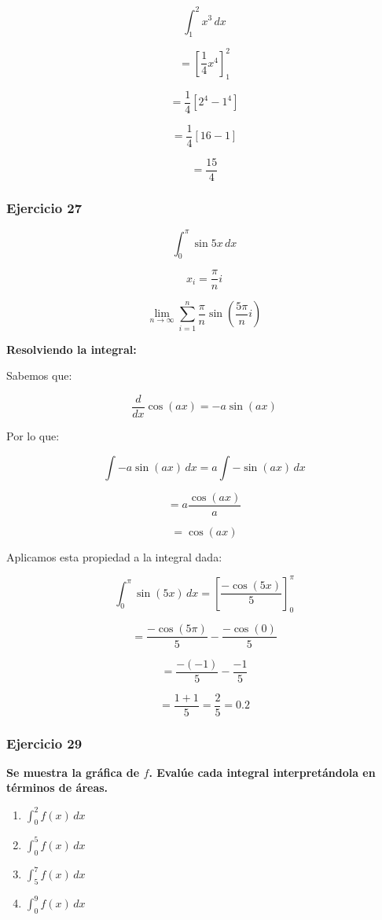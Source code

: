 \[
\int_{1}^{2} x^3 \,dx
\]

\[
= \left[ \frac{1}{4} x^4 \right]_{1}^{2}
\]

\[
= \frac{1}{4} \left[ 2^4 - 1^4 \right]
\]

\[
= \frac{1}{4} \left[ 16 - 1 \right]
\]

\[
= \frac{15}{4}
\]


\subsubsection*{Ejercicio 27}

\[
\int_{0}^{\pi} \sin 5x \,dx
\]

\[
x_i = \frac{\pi}{n} i
\]

\[
\lim_{n \to \infty} \sum_{i=1}^{n} \frac{\pi}{n} \sin \left( \frac{5\pi}{n} i \right)
\]

\textbf{Resolviendo la integral:}

Sabemos que:

\[
\frac{d}{dx} \cos(ax) = -a \sin(ax)
\]

Por lo que:

\[
\int -a \sin(ax) \,dx = a \int -\sin(ax) \,dx
\]

\[
= a \frac{\cos(ax)}{a}
\]

\[
= \cos(ax)
\]

Aplicamos esta propiedad a la integral dada:

\[
\int_{0}^{\pi} \sin(5x) \,dx = \left[ \frac{-\cos(5x)}{5} \right]_{0}^{\pi}
\]

\[
= \frac{-\cos(5\pi)}{5} - \frac{-\cos(0)}{5}
\]

\[
= \frac{-(-1)}{5} - \frac{-1}{5}
\]

\[
= \frac{1 + 1}{5} = \frac{2}{5} = 0.2
\]

\subsubsection*{Ejercicio 29}

\textbf{Se muestra la gráfica de \( f \). Evalúe cada integral interpretándola en términos de áreas.}

\begin{enumerate}[label=(\alph*)]
    \item \( \int_{0}^{2} f(x) \,dx \)
    \item \( \int_{0}^{5} f(x) \,dx \)
    \item \( \int_{5}^{7} f(x) \,dx \)
    \item \( \int_{0}^{9} f(x) \,dx \)
\end{enumerate}

